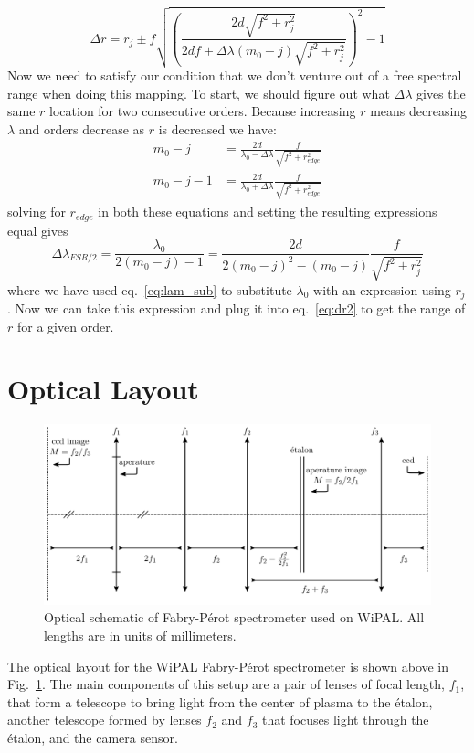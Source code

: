 \documentclass{article}
\begin{document}
\begin{equation}
\Delta r = r_{j} \pm f\sqrt{\left(\frac{2d\sqrt{f^{2}+r_{j}^{2}}}{2df+\Delta\lambda(m_{0}-j)\sqrt{f^{2}+r_{j}^{2}}}\right)^{2}-1}
\label{eq:dr2}
\end{equation}
Now we need to satisfy our condition that we don't venture out of a free spectral range when doing this mapping. To start, we should figure out what $\Delta\lambda$ gives the same $r$ location for two consecutive orders. Because increasing $r$ means decreasing $\lambda$ and orders decrease as $r$ is decreased we have:
\begin{align}
m_{0}-j&=\frac{2d}{\lambda_{0}-\Delta\lambda}\frac{f}{\sqrt{f^{2}+r_{edge}^{2}}}\\
m_{0}-j-1&=\frac{2d}{\lambda_{0}+\Delta\lambda}\frac{f}{\sqrt{f^{2}+r_{edge}^{2}}}
\end{align}
solving for $r_{edge}$ in both these equations and setting the resulting expressions equal gives
\begin{equation}
\Delta\lambda_{FSR/2}=\frac{\lambda_{0}}{2(m_{0}-j)-1}=\frac{2d}{2(m_{0}-j)^{2}-(m_{0}-j)}\frac{f}{\sqrt{f^{2}+r_{j}^{2}}}
\end{equation}
where we have used eq.~\ref{eq:lam_sub} to substitute $\lambda_{0}$ with an expression using $r_{j}$. Now we can take this expression and plug it into eq.~\ref{eq:dr2} to get the range of $r$ for a given order. 


\section{Optical Layout}
\begin{figure}
\includegraphics[width=\textwidth]{Images/OpticalLayout.png}
\caption{Optical schematic of Fabry-P\'{e}rot spectrometer used on WiPAL. All lengths are in units of millimeters. \label{fig:opticalsetup}}
\end{figure}
The optical layout for the WiPAL Fabry-P\'{e}rot spectrometer is shown above in Fig.~\ref{fig:opticalsetup}. The main components of this setup are a pair of lenses of focal length, $f_{1}$, that form a telescope to bring light from the center of plasma to the \'{e}talon, another telescope formed by lenses $f_{2}$ and $f_{3}$ that focuses light through the \'{e}talon, and the camera sensor.
\end{document}
